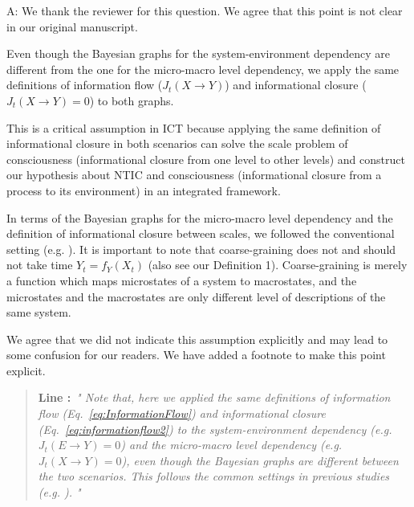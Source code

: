 \documentclass[utf8]{article}
\newenvironment{ans}  
    {\color{Black}\noindent A:}
    {~\newline}
\newcommand{\addnew}[2]{\blockcquote{}{\textbf{Line #1:}~\newline\textit{"#2"}}
}
\begin{document}
    	\begin{ans}
    		We thank the reviewer for this question. We agree that this point is not clear in our original manuscript.
    		
    		Even though the Bayesian graphs for the system-environment dependency are different from the one for the micro-macro level dependency, we apply the same definitions of information flow ($J_{t}(X \rightarrow Y )$) and informational closure ($J_{t}(X \rightarrow Y )=0$) to both graphs. 
    		
    		This is a critical assumption in ICT because applying the same definition of informational closure in both scenarios can solve the scale problem of consciousness (informational closure from one level to other levels) and construct our hypothesis about NTIC and consciousness (informational closure from a process to its environment) in an integrated framework.
    		
    		In terms of the Bayesian graphs for the micro-macro level dependency and the definition of informational closure between scales, we followed the conventional setting (e.g. \cite{PFANTE.2014}). It is important to note that coarse-graining does not and should not take time $Y_t=f_Y(X_t)$ (also see our Definition 1). Coarse-graining is merely a function which maps microstates of a system to macrostates, and the microstates and the macrostates are only different level of descriptions of the same system.
    		
    		We agree that we did not indicate this assumption explicitly and may lead to some confusion for our readers. We have added a footnote to make this point explicit. 
    		
    		\addnew{}{
    			Note that, here we applied the same definitions of information flow (Eq.~\ref{eq:InformationFlow}) and informational closure (Eq.~\ref{eq:informationflow2}) to the system-environment dependency (e.g. $J_{t}(E \rightarrow Y )=0$) and the micro-macro level dependency (e.g. $J_{t}(X \rightarrow Y )=0$), even though the Bayesian graphs are different between the two scenarios. This follows the common settings in previous studies (e.g. \cite{BERTSCHINGER.2006, PFANTE.2014}).
    		}	
    		
    		
    		

\end{ans}
\end{document}
